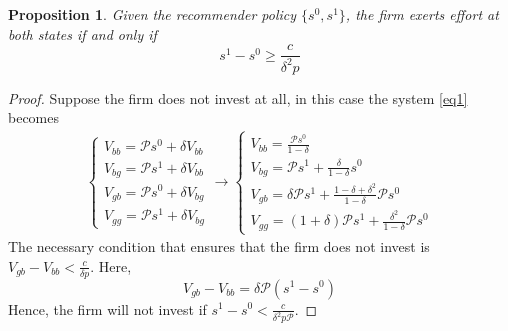 \documentclass[a4paper]{article}
\newtheorem{proposition}[theorem]{Proposition}
\begin{document}
\begin{proposition}\label{prop1}
	Given the recommender policy $\{s^0, s^1\}$, the firm exerts effort at both states if and only if $$s^1 - s^0 \ge \frac{c}{\delta^2 p}$$
\end{proposition}
\begin{proof}
	Suppose the firm does not invest at all, in this case the system \eqref{eq1} becomes
	\begin{align*}
	\begin{cases}
	V_{bb} = \mathcal{P}s^0 + \delta V_{bb}\\
	V_{bg} = \mathcal{P}s^1 + \delta V_{bb}\\
	V_{gb} = \mathcal{P}s^0 + \delta V_{bg}\\
	V_{gg} = \mathcal{P}s^1 + \delta V_{bg}
	\end{cases} \to \begin{cases}
	V_{bb} = \frac{\mathcal{P}s^0}{1-\delta}\\
	V_{bg} = \mathcal{P}s^1 +\frac{\delta}{1-\delta}s^0\\
	V_{gb} = \delta \mathcal{P}s^1 + \frac{1-\delta + \delta^2}{1-\delta}\mathcal{P}s^0\\
	V_{gg} = (1+\delta)\mathcal{P}s^1 + \frac{\delta^2}{1-\delta}\mathcal{P}s^0
	\end{cases}
	\end{align*}
	The necessary condition that ensures that the firm does not invest is $	V_{gb} - V_{bb} < \frac{c}{\delta p}$. Here, $$	V_{gb} - V_{bb} = \delta \mathcal{P}(s^1 - s^0)$$ Hence, the firm will not invest if $s^1 - s^0 < \frac{c}{\delta^2 p \mathcal{P}}$.
	
	
	

\end{proof}
\end{document}

